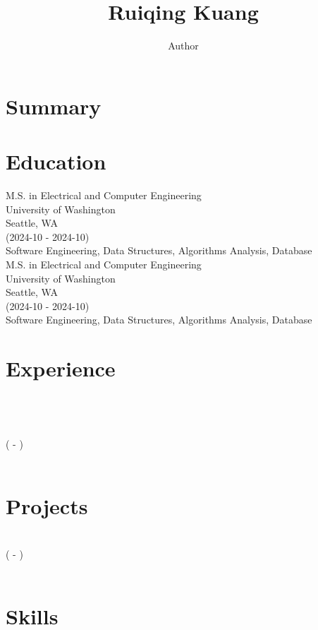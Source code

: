 \documentclass{article}%
\title{Ruiqing Kuang}%
\author{Author}%
\begin{document}
%
\normalsize%
\maketitle%
\section{Summary}%
\label{sec:Summary}%

%
\section{Education}%
\label{sec:Education}%
M.S. in Electrical and Computer Engineering \\ %
University of Washington \\ %
Seattle, WA \\ %
(2024-10 - 2024-10) \\ %
Software Engineering, Data Structures, Algorithms Analysis, Database \\ %
M.S. in Electrical and Computer Engineering \\ %
University of Washington \\ %
Seattle, WA \\ %
(2024-10 - 2024-10) \\ %
Software Engineering, Data Structures, Algorithms Analysis, Database \\ 

%
\section{Experience}%
\label{sec:Experience}%
 \\ %
 \\ %
 \\ %
( - ) \\ %
 \\ 

%
\section{Projects}%
\label{sec:Projects}%
 \\ %
( - ) \\ %
 \\ 

%
\section{Skills}%
\label{sec:Skills}%

%
\end{document}

